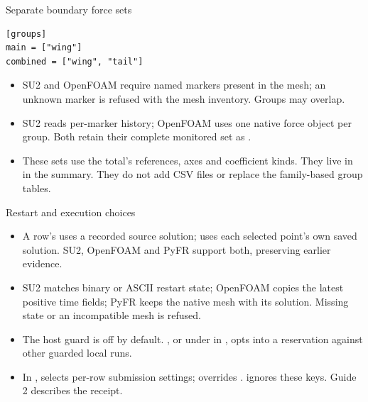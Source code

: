 \begin{frame}[fragile]{Separate boundary force sets}
\begin{lstlisting}[style=cfdbtoml]
[groups]
main = ["wing"]
combined = ["wing", "tail"]
\end{lstlisting}
\begin{itemize}\small
  \item SU2 and OpenFOAM require named markers present in the mesh; an unknown
        marker is refused with the mesh inventory. Groups may overlap.
  \item SU2 reads per-marker history; OpenFOAM uses one native force object per
        group. Both retain their complete monitored set as .
  \item These sets use the total's references, axes and coefficient kinds.
        They live in  in the summary.
        They do not add CSV files or replace the family-based group tables.
\end{itemize}
\end{frame}

\begin{frame}{Restart and execution choices}
\begin{itemize}\small
  \item A row's  uses a recorded source solution;
         uses each selected point's own saved solution.
        SU2, OpenFOAM and PyFR support both, preserving earlier evidence.
  \item SU2 matches binary or ASCII restart state; OpenFOAM copies the latest
        positive time fields; PyFR keeps the native mesh with its solution.
        Missing state or an incompatible mesh is refused.
  \item The host guard is off by default. , or
         under \code{[solver]} in , opts into a
        reservation against other guarded local runs.
  \item In , 
        selects per-row submission settings;  overrides .
         ignores these keys. Guide 2 describes the receipt.
\end{itemize}
\end{frame}
